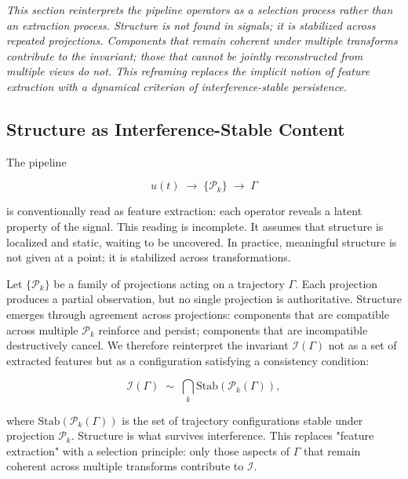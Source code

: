 \documentclass[12pt, a4paper]{article}
\begin{document}
\noindent\textit{This section reinterprets the pipeline operators as a selection process rather than an extraction process. Structure is not found in signals; it is stabilized across repeated projections. Components that remain coherent under multiple transforms contribute to the invariant; those that cannot be jointly reconstructed from multiple views do not. This reframing replaces the implicit notion of feature extraction with a dynamical criterion of interference-stable persistence.}

\subsection{Structure as Interference-Stable Content}

The pipeline

\begin{equation}
u(t) \;\longrightarrow\; \{\mathcal{P}_k\} \;\longrightarrow\; \Gamma
\label{eq:pipeline_again}
\end{equation}

is conventionally read as feature extraction: each operator reveals a latent property of the signal. This reading is incomplete. It assumes that structure is localized and static, waiting to be uncovered. In practice, meaningful structure is not given at a point; it is stabilized across transformations.

Let $\{\mathcal{P}_k\}$ be a family of projections acting on a trajectory $\Gamma$. Each projection produces a partial observation, but no single projection is authoritative. Structure emerges through agreement across projections: components that are compatible across multiple $\mathcal{P}_k$ reinforce and persist; components that are incompatible destructively cancel. We therefore reinterpret the invariant $\mathcal{I}(\Gamma)$ not as a set of extracted features but as a configuration satisfying a consistency condition:

\begin{equation}
\mathcal{I}(\Gamma) \;\sim\; \bigcap_k \mathrm{Stab}(\mathcal{P}_k(\Gamma)),
\label{eq:stab}
\end{equation}

where $\mathrm{Stab}(\mathcal{P}_k(\Gamma))$ is the set of trajectory configurations stable under projection $\mathcal{P}_k$. Structure is what survives interference. This replaces "feature extraction" with a selection principle: only those aspects of $\Gamma$ that remain coherent across multiple transforms contribute to $\mathcal{I}$.
\end{document}
